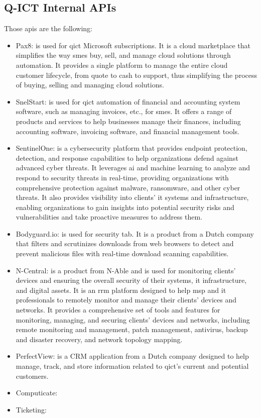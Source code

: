 \begin{multicols}{2}
    \subsection{Q-ICT Internal APIs}
    Those \acrshort{api}s are the following:
    \begin{itemize}
        \item Pax8: is used for \acrshort{qict} Microsoft subscriptions. It is a cloud marketplace that simplifies the way
              \acrshort{sme}s buy, sell, and manage cloud solutions through automation. It provides a single platform to
              manage the entire cloud customer lifecycle, from quote to cash to support, thus simplifying the process of buying, selling
              and managing cloud solutions.
        \item SnelStart: is used for \acrshort{qict} automation of financial and accounting system software, such as managing invoices, etc.,
              for \acrshort{sme}s. It offers a range of products and services to help businesses manage their finances, including accounting
              software, invoicing software, and financial management tools.
        \item SentinelOne: is a cybersecurity platform that provides endpoint protection, detection, and response capabilities
              to help organizations defend against advanced cyber threats. It leverages \acrlong{ai} and machine learning to
              analyze and respond to security threats in real-time, providing organizations with comprehensive protection against
              malware, ransomware, and other cyber threats. It also provides visibility into clients' \acrshort{it} systems and
              infrastructure, enabling organizations to gain insights into potential security risks and vulnerabilities and take
              proactive measures to address them.
        \item Bodyguard.io: is used for security tab. It is a product from a Dutch company that filters and scrutinizes downloads from
              web browsers to detect and prevent malicious files with real-time download scanning capabilities.
        \item N-Central: is a product from N-Able and is used for monitoring clients' devices and ensuring the overall security of
              their systems, \acrshort{it} infrastructure, and digital assets. It is an \acrshort{rrm} platform designed to help \acrshort{msp}
              and \acrshort{it} professionals to remotely monitor and manage their clients' devices and networks. It provides a comprehensive
              set of tools and features for monitoring, managing, and securing clients' devices and networks, including remote monitoring and
              management, patch management, antivirus, backup and disaster recovery, and network topology mapping.
        \item PerfectView: is a \gls{CRM} application from a Dutch company designed to help manage, track, and store information related
              to \acrshort{qict}'s current and potential customers.
        \item Computicate:
        \item Ticketing:
    \end{itemize}

\end{multicols}
